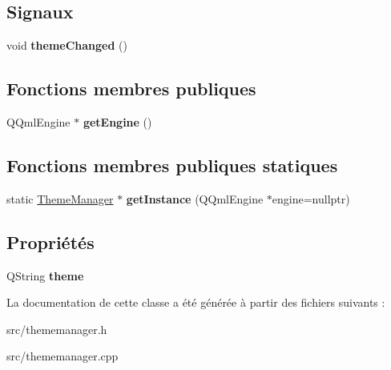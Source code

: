 \subsection*{Signaux}
\begin{DoxyCompactItemize}
\item 
void {\bfseries theme\+Changed} ()\hypertarget{class_theme_manager_a6e64af50ca5000e922470470d0ca419e}{}\label{class_theme_manager_a6e64af50ca5000e922470470d0ca419e}

\end{DoxyCompactItemize}
\subsection*{Fonctions membres publiques}
\begin{DoxyCompactItemize}
\item 
Q\+Qml\+Engine $\ast$ {\bfseries get\+Engine} ()\hypertarget{class_theme_manager_adf57a1d113b0fe94263a58260aa36317}{}\label{class_theme_manager_adf57a1d113b0fe94263a58260aa36317}

\end{DoxyCompactItemize}
\subsection*{Fonctions membres publiques statiques}
\begin{DoxyCompactItemize}
\item 
static \hyperlink{class_theme_manager}{Theme\+Manager} $\ast$ {\bfseries get\+Instance} (Q\+Qml\+Engine $\ast$engine=nullptr)\hypertarget{class_theme_manager_a657d0bdc7b912e733432fb1cb2ffbc56}{}\label{class_theme_manager_a657d0bdc7b912e733432fb1cb2ffbc56}

\end{DoxyCompactItemize}
\subsection*{Propriétés}
\begin{DoxyCompactItemize}
\item 
Q\+String {\bfseries theme}\hypertarget{class_theme_manager_aef7be23ae1399864a637b130d7c28b27}{}\label{class_theme_manager_aef7be23ae1399864a637b130d7c28b27}

\end{DoxyCompactItemize}


La documentation de cette classe a été générée à partir des fichiers suivants \+:\begin{DoxyCompactItemize}
\item 
src/thememanager.\+h\item 
src/thememanager.\+cpp\end{DoxyCompactItemize}
